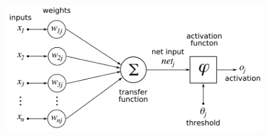 \begin{center}
	\begin{figure}[H]
		\centering
		\includegraphics[width=0.75\columnwidth]{images/chap2/ANN_detail.png}
		\label{chap2:neural_net_detail}
		
	\end{figure}
\end{center}



